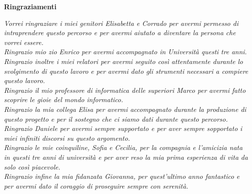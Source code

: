 \thispagestyle{empty}

\begin{center}
  {\bf \Huge Ringraziamenti}
\end{center}

\vspace{4cm}
\emph{Vorrei ringraziare i miei genitori Elisabetta e Corrado per avermi permesso di intraprendere questo percorso e per avermi aiutato a diventare la persona che vorrei essere.\\[12pt]
	Ringrazio mio zio Enrico per avermi accompagnato in Universit\`a questi tre anni.\\[12pt]
	Ringrazio inoltre i miei relatori per avermi seguito cos\`i attentamente durante lo svolgimento di questo lavoro e per avermi dato gli strumenti necessari a compiere questo lavoro.\\[12pt]
	Ringrazio il mio professore di informatica delle superiori Marco per avermi fatto scoprire le gioie del mondo informatico.\\[12pt]
	Ringrazio la mia collega Elisa per avermi accompagnato durante la produzione di questo progetto e per il sostegno che ci siamo dati durante questo percorso.\\[12pt]
	Ringrazio Daniele per avermi sempre supportato e per aver sempre sopportato i miei infiniti discorsi su questo argomento.\\[12pt]
	Ringrazio le mie coinquiline, Sofia e Cecilia, per la compagnia e l'amicizia nata in questi tre anni di universit\`a e per aver reso la mia prima esperienza di vita da solo cos\`i piacevole.\\[12pt]
	Ringrazio infine la mia fidanzata Giovanna, per quest'ultimo anno fantastico e per avermi dato il coraggio di proseguire sempre con serenit\`a.
}
